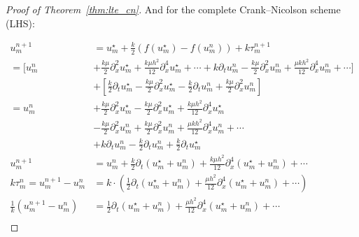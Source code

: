 \begin{proof}[Proof of Theorem~\ref{thm:lte_cn}]
  And for the complete Crank--Nicolson scheme (LHS):

  \begin{align*}
    u_m^{n+1}                                 & = u_m^\star + \tfrac{k}{2}\left(f(u_m^\star) - f(u_m^n)\right) + k\tau_m^{n+1}                                                                                                                                  \\
    = \bigl[u_m^n                             & +\tfrac{k \mu}{2}\partial_x^2 u_m^\star + \tfrac{k \mu h^2}{12}\partial_x^4 u_m^\star + \cdots + k\partial_t u_m^n - \tfrac{k\mu}{2}\partial_x^2 u_m^n + \tfrac{\mu k h^2}{12}\partial_x^4 u_m^n + \cdots\bigr] \\
                                              & + \left[\tfrac{k}{2}\partial_t u_m^\star - \tfrac{k\mu}{2}\partial_x^2 u_m^\star - \tfrac{k}{2}\partial_t u_m^n + \tfrac{k\mu}{2}\partial_x^2 u_m^n\right]                                                      \\
    = u_m^n                                   & +\tfrac{k \mu}{2}\partial_x^2 u_m^\star -  \tfrac{k\mu}{2}\partial_x^2 u_m^\star +\tfrac{k \mu h^2}{12}\partial_x^4 u_m^\star                                                                                   \\
                                              & - \tfrac{k\mu}{2}\partial_x^2 u_m^n +  \tfrac{k\mu}{2}\partial_x^2 u_m^n +  \tfrac{\mu k h^2}{12}\partial_x^4 u_m^n + \cdots                                                                                    \\
                                              & + k\partial_t u_m^n - \tfrac{k}{2}\partial_t u_m^n + \tfrac{k}{2}\partial_t u_m^\star                                                                                                                           \\
    u_m^{n+1}                                 & = u_m^n + \tfrac{k}{2}\partial_t\left(u_m^\star + u_m^n\right) + \tfrac{k \mu h^2}{12}\partial_x^4 \left(u_m^\star + u_m^n\right) + \cdots                                                                      \\
    k\tau_m^n = u_m^{n+1} - u_m^n             & = k\cdot\left(\tfrac{1}{2}\partial_t\left(u_m^\star + u_m^n\right) + \tfrac{\mu h^2}{12}\partial_x^4 \left(u_m^\star + u_m^n\right) + \cdots\right)                                                             \\
    \frac{1}{k}\left(u_m^{n+1} - u_m^n\right) & = \tfrac{1}{2}\partial_t\left(u_m^\star + u_m^n\right) + \tfrac{\mu h^2}{12}\partial_x^4 \left(u_m^\star + u_m^n\right) + \cdots\\

\end{align*}
\end{proof}
